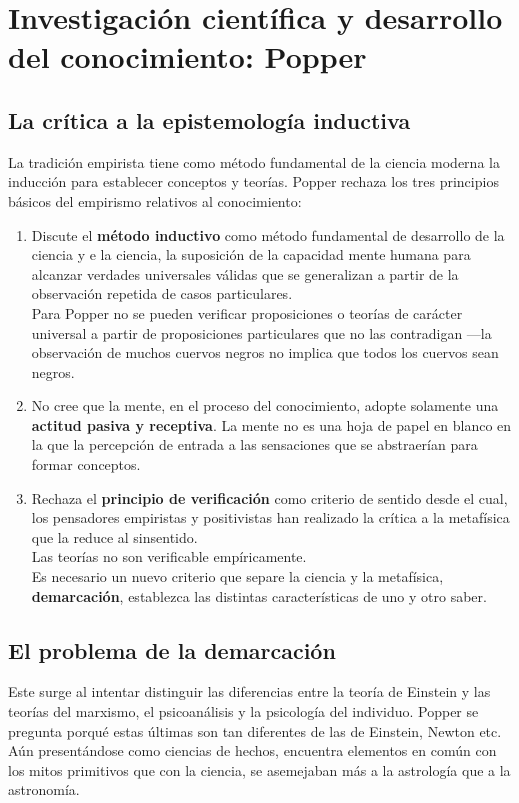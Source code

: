 \documentclass[a4paper, 11pt, twocolumn, spanish]{article}
\begin{document}
\section{Investigación científica y desarrollo del conocimiento: Popper}
\label{sec:org4e27560}
\subsection{La crítica a la epistemología inductiva}
\label{sec:org88d5143}
La tradición empirista tiene como método fundamental de la ciencia
moderna la inducción para establecer conceptos y teorías. Popper
rechaza los tres principios básicos del empirismo relativos al
conocimiento:
\begin{enumerate}
\item Discute el \textbf{método inductivo} como método fundamental de desarrollo
de la ciencia y e la ciencia, la suposición de la capacidad mente
humana para alcanzar verdades universales válidas que se
generalizan a partir de la observación repetida de casos
particulares.\\[0pt]
Para Popper no se pueden verificar proposiciones o teorías de
carácter universal a partir de proposiciones particulares que no
las contradigan —la observación de muchos cuervos negros no
implica que todos los cuervos sean negros.
\item No cree que la mente, en el proceso del conocimiento, adopte
solamente una \textbf{actitud pasiva y receptiva}. La mente no es una hoja
de papel en blanco en la que la percepción de entrada a las
sensaciones que se abstraerían para formar conceptos.
\item Rechaza el \textbf{principio de verificación} como criterio de sentido
desde el cual, los pensadores empiristas y positivistas han
realizado la crítica a la metafísica que la reduce al
sinsentido.\\[0pt]
Las teorías no son verificable empíricamente.\\[0pt]
Es necesario un nuevo criterio que separe la ciencia y la
metafísica, \textbf{demarcación}, establezca las distintas características de uno y
otro saber.
\end{enumerate}

\subsection{El problema de la demarcación}
\label{sec:org7f1a740}
Este surge al intentar distinguir las diferencias entre la teoría de
Einstein y las teorías del marxismo, el psicoanálisis y la psicología
del individuo. Popper se pregunta porqué estas últimas son tan
diferentes de las de Einstein, Newton etc. Aún presentándose como
ciencias de hechos, encuentra elementos en común con los mitos
primitivos que con la ciencia, se asemejaban más a la astrología que a
la astronomía.\\[0pt]
\end{document}
